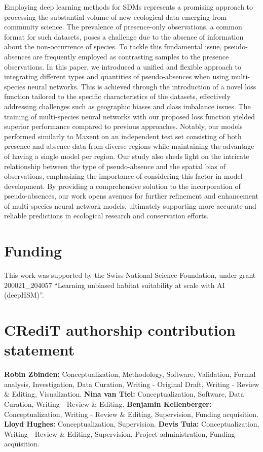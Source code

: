 \documentclass[3p,preprint,12pt]{elsarticle}
\begin{document}
Employing deep learning methods for SDMs represents a promising approach to processing the substantial volume of new ecological data emerging from community science. The prevalence of presence-only observations, a common format for such datasets, poses a challenge due to the absence of information about the non-occurrence of species. To tackle this fundamental issue, pseudo-absences are frequently employed as contrasting samples to the presence observations.
In this paper, we introduced a unified and flexible approach to integrating different types and quantities of pseudo-absences when using multi-species neural networks. This is achieved through the introduction of a novel loss function tailored to the specific characteristics of the datasets, effectively addressing challenges such as geographic biases and class imbalance issues.
The training of multi-species neural networks with our proposed loss function yielded superior performance compared to previous approaches. Notably, our models performed similarly to Maxent on an independent test set consisting of both presence and absence data from diverse regions while maintaining the advantage of having a single model per region.
Our study also sheds light on the intricate relationship between the type of pseudo-absence and the spatial bias of observations, emphasizing the importance of considering this factor in model development. By providing a comprehensive solution to the incorporation of pseudo-absences, our work opens avenues for further refinement and enhancement of multi-species neural network models, ultimately supporting more accurate and reliable predictions in ecological research and conservation efforts.

\section*{Funding}
This work was supported by the Swiss National Science Foundation, under grant 200021\_204057 ``Learning unbiased habitat suitability at scale with AI (deepHSM)''.

\section*{CRediT authorship contribution statement}
\textbf{Robin Zbinden:} Conceptualization, Methodology, Software, Validation, Formal analysis, Investigation, Data Curation, Writing - Original Draft, Writing - Review \& Editing, Visualization. \textbf{Nina van Tiel:} Conceptualization, Software, Data Curation, Writing - Review \& Editing. \textbf{Benjamin Kellenberger:} Conceptualization, Writing - Review \& Editing, Supervision, Funding acquisition. \textbf{Lloyd Hughes:} Conceptualization, Supervision. \textbf{Devis Tuia:} Conceptualization, Writing - Review \& Editing, Supervision, Project administration, Funding acquisition.
\end{document}
